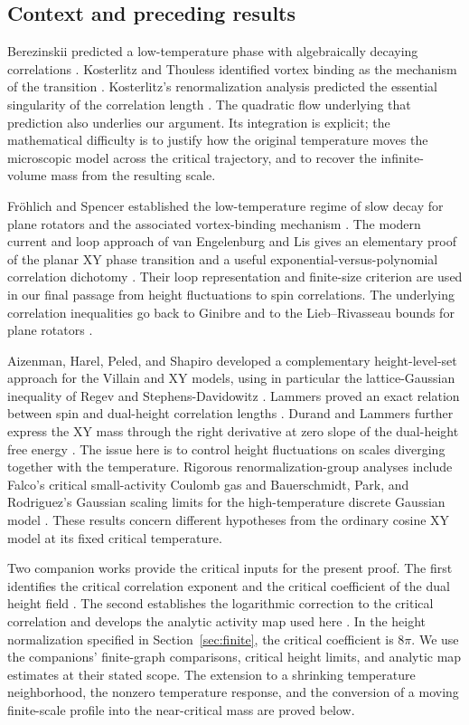 \subsection{Context and preceding results}
Berezinskii predicted a low-temperature phase with algebraically decaying correlations \cite{Berezinskii}. Kosterlitz and Thouless identified vortex binding as the mechanism of the transition \cite{KT}. Kosterlitz's renormalization analysis predicted the essential singularity of the correlation length \cite{Kosterlitz}. The quadratic flow underlying that prediction also underlies our argument. Its integration is explicit; the mathematical difficulty is to justify how the original temperature moves the microscopic model across the critical trajectory, and to recover the infinite-volume mass from the resulting scale.

Fr\"ohlich and Spencer established the low-temperature regime of slow decay for plane rotators and the associated vortex-binding mechanism \cite{FS}. The modern current and loop approach of van Engelenburg and Lis gives an elementary proof of the planar XY phase transition and a useful exponential-versus-polynomial correlation dichotomy \cite{vEL}. Their loop representation and finite-size criterion are used in our final passage from height fluctuations to spin correlations. The underlying correlation inequalities go back to Ginibre and to the Lieb--Rivasseau bounds for plane rotators \cite{Ginibre,Lieb,Rivasseau}.

Aizenman, Harel, Peled, and Shapiro developed a complementary height-level-set approach for the Villain and XY models, using in particular the lattice-Gaussian inequality of Regev and Stephens-Davidowitz \cite{AHPS,RSD}. Lammers proved an exact relation between spin and dual-height correlation lengths \cite[Theorem~1]{Lammers}. Durand and Lammers further express the XY mass through the right derivative at zero slope of the dual-height free energy \cite[Theorem~1.4]{DurandLammers}. The issue here is to control height fluctuations on scales diverging together with the temperature. Rigorous renormalization-group analyses include Falco's critical small-activity Coulomb gas and Bauerschmidt, Park, and Rodriguez's Gaussian scaling limits for the high-temperature discrete Gaussian model \cite{Falco,BPR1,BPR2}. These results concern different hypotheses from the ordinary cosine XY model at its fixed critical temperature.

Two companion works provide the critical inputs for the present proof. The first identifies the critical correlation exponent and the critical coefficient of the dual height field \cite{X}. The second establishes the logarithmic correction to the critical correlation and develops the analytic activity map used here \cite{F}. In the height normalization specified in Section~\ref{sec:finite}, the critical coefficient is $8\pi$. We use the companions' finite-graph comparisons, critical height limits, and analytic map estimates at their stated scope. The extension to a shrinking temperature neighborhood, the nonzero temperature response, and the conversion of a moving finite-scale profile into the near-critical mass are proved below.

